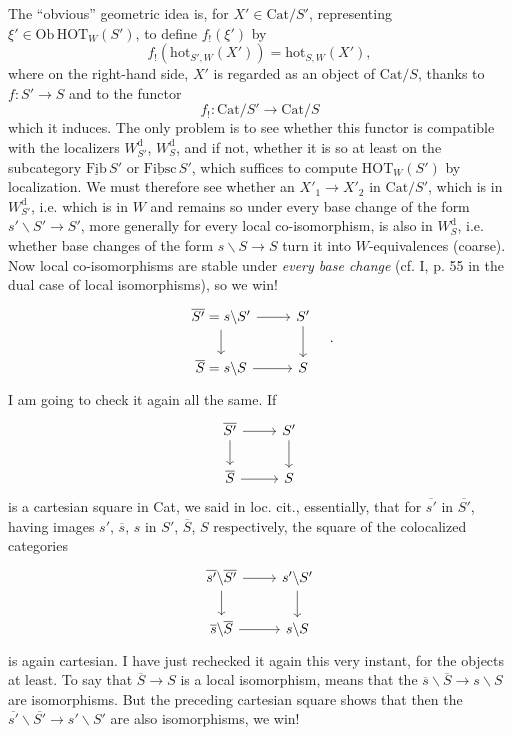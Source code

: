 \documentclass[11pt]{article}
\newcommand{\printedpage}[1]{\marginpar{\footnotesize p.~#1}}
\newcommand{\msp}[1]{\marginpar{\footnotesize [#1]}}
\newcommand{\HOT}{\mathrm{HOT}}
\newcommand{\Cat}{\mathrm{Cat}}
\newcommand{\Ob}{\mathrm{Ob}}
\newcommand{\hot}{\mathrm{hot}}
\newcommand{\uFib}{\underline{\mathrm{Fib}}}
\newcommand{\uFibsc}{\underline{\mathrm{Fibsc}}}
\begin{document}
The ``obvious'' geometric idea is, for $X'\in\Cat/S'$, representing $\xi'\in\Ob\,\HOT_W(S')$, to define $f_!(\xi')$ by
\[ f_!(\hot_{S',W}(X')) = \hot_{S,W}(X'), \]
where on the right-hand side, $X'$ is regarded as an object of $\Cat/S$, thanks to $f:S'\longrightarrow S$ and to the functor
\[ f_! : \Cat/S' \longrightarrow \Cat/S \]
which it induces. The only problem is to see whether this functor is compatible with the
\msp{page 135}
localizers $W_{S'}^{\mathrm{d}}$, $W_S^{\mathrm{d}}$, and if not, whether it is so at least on the subcategory $\uFib\,S'$ or $\uFibsc\,S'$, which suffices to compute $\HOT_W(S')$ by localization. We must therefore see whether an $X'_1\longrightarrow X'_2$ in $\Cat/S'$, which is in $W_{S'}^{\mathrm{d}}$, i.e. which is in $W$ and remains so under every base change of the form $s'\backslash S'\longrightarrow S'$, more generally for every local co-isomorphism, is also in $W_S^{\mathrm{d}}$, i.e. whether base changes of the form $s\backslash S\longrightarrow S$ turn it into $W$-equivalences (coarse). Now local co-isomorphisms are stable under \textit{every base change} (cf. I, p. 55 in the dual case of local isomorphisms), so we win!
\[
\begin{tikzcd}
\overline{S'} = s\backslash S' \arrow[r] \arrow[d] & S' \arrow[d] \\
\overline{S} = s\backslash S \arrow[r] & S
\end{tikzcd}
\quad .
\]
I am going to check it again all the same. If
\[
\begin{tikzcd}
\overline{S'} \arrow[r] \arrow[d] & S' \arrow[d] \\
\overline{S} \arrow[r] & S
\end{tikzcd}
\]
\printedpage{83}
is a cartesian square in Cat, we said in loc. cit., essentially, that for $\overline{s'}$ in $\overline{S'}$, having images $s'$, $\overline{s}$, $s$ in $S'$, $\overline{S}$, $S$ respectively, the square of the colocalized categories
\[
\begin{tikzcd}
\overline{s'}\backslash\overline{S'} \arrow[r] \arrow[d] & s'\backslash S' \arrow[d] \\
\overline{s}\backslash\overline{S} \arrow[r] & s\backslash S
\end{tikzcd}
\]
is again
\msp{page 136}
cartesian. I have just rechecked it again this very instant, for the objects at least. To say that $\overline{S}\longrightarrow S$ is a local isomorphism, means that the $\overline{s}\backslash\overline{S}\longrightarrow s\backslash S$ are isomorphisms. But the preceding cartesian square shows that then the $\overline{s'}\backslash\overline{S'}\longrightarrow s'\backslash S'$ are also isomorphisms, we win! %
\end{document}
